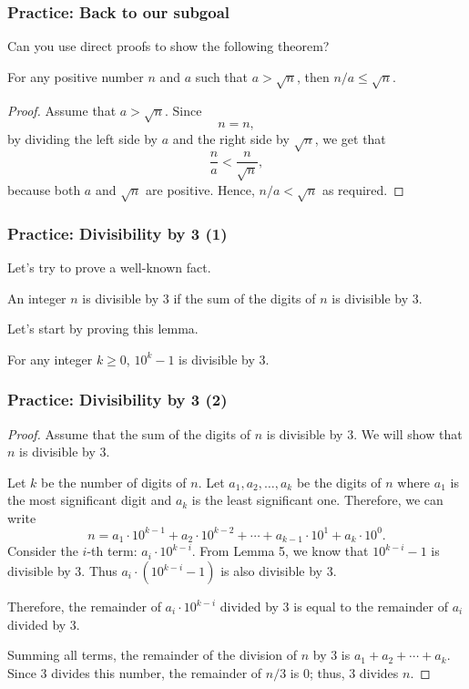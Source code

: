\begin{frame}\frametitle{Practice: Back to our subgoal}
  Can you use direct proofs to show the following theorem?

  \begin{theorem}
    For any positive number $n$ and $a$ such that $a > \sqrt{n}$, then
    $n/a\leq\sqrt{n}$.
  \end{theorem} \pause

  \begin{proof}
    Assume that $a > \sqrt{n}$. \pause
    Since
    \[ n = n, \]
    by dividing the left side by $a$ and the right side by $\sqrt{n}$,
    we get that
    \[ \frac{n}{a} < \frac{n}{\sqrt{n}}, \]
    because both $a$ and $\sqrt{n}$ are positive.  Hence, $n/a <
    \sqrt{n}$ as required.
  \end{proof}
\end{frame}

\begin{frame}\frametitle{Practice: Divisibility by 3 (1)}
  Let's try to prove a well-known fact.

  \begin{theorem}
    An integer $n$ is divisible by $3$ if the sum of the digits of $n$
    is divisible by $3$.
  \end{theorem}
  \pause

  \vspace{0.2in}
  Let's start by proving this lemma.

  \begin{lemma}
    For any integer $k\geq 0$, $10^k - 1$ is divisible by $3$.
  \end{lemma}
\end{frame}

\begin{frame}\frametitle{Practice: Divisibility by 3 (2)}
  {\small
    \begin{proof}
      Assume that the sum of the digits of $n$ is divisible by $3$.
      We will show that $n$ is divisible by $3$.
      
      Let $k$ be the number of digits of $n$.  Let
      $a_1,a_2,\ldots,a_k$ be the digits of $n$ where $a_1$ is the
      most significant digit and $a_k$ is the least significant one.
      Therefore, we can write
      \[ n = a_1\cdot 10^{k-1} + a_2\cdot 10^{k-2} + \cdots + a_{k-1}\cdot 10^1 + a_k\cdot 10^0.\]
      Consider the $i$-th term: $a_i\cdot 10^{k-i}$.  From Lemma 5,
      we know that $10^{k-i} - 1$ is divisible by 3.  Thus
      $a_i\cdot(10^{k-i}-1)$ is also divisible by $3$.

      Therefore, the remainder of $a_i\cdot 10^{k-i}$ divided by $3$
      is equal to the remainder of $a_i$ divided by $3$.

      Summing all terms, the remainder of the division of $n$ by $3$
      is $a_1+a_2+\cdots+ a_k$.  Since $3$ divides this number, the
      remainder of $n/3$ is 0; thus, $3$ divides $n$.
    \end{proof}
  }
\end{frame}

